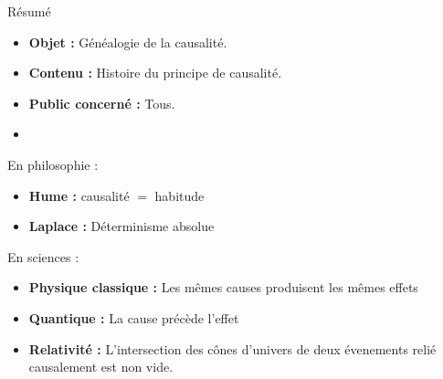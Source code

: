\begin{center}
\Large
Résumé
\normalsize
\end{center}
\vspace{3cm}
\begin{itemize}[leftmargin=1cm, label=, itemsep=21pt]
\item {\bf Objet : } Généalogie de la causalité.
\item {\bf Contenu : } Histoire du principe de causalité.
\item {\bf Public concerné : } Tous.
\end{itemize}

\vspace{3cm}



\begin{itemize}[leftmargin=1cm, label=, itemsep=21pt]
\item {\bf  } 
\end{itemize}
En philosophie :
\begin{itemize}[leftmargin=1cm, label=, itemsep=21pt]
\item {\bf Hume : } causalité $=$ habitude
\item {\bf Laplace : } Déterminisme absolue
\end{itemize}
En sciences :
\begin{itemize}[leftmargin=1cm, label=, itemsep=21pt]
\item {\bf Physique classique : } Les mêmes causes  produisent les mêmes effets
\item {\bf Quantique : } La cause précède l'effet
\item {\bf Relativité : } L'intersection des cônes d'univers de deux évenements relié causalement est non vide.
\end{itemize}
